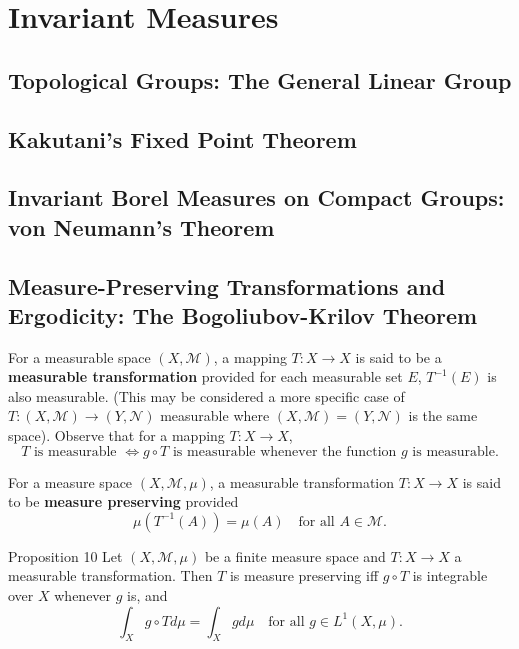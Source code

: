 \chapter{Invariant Measures}

\section{Topological Groups: The General Linear Group}

\section{Kakutani's Fixed Point Theorem}
\section{Invariant Borel Measures on Compact Groups: von Neumann's Theorem}
\section{Measure-Preserving Transformations and Ergodicity: The Bogoliubov-Krilov Theorem}

For a measurable space $(X,\mathcal{M})$, a mapping $T:X\to X$ is said to be a \textbf{measurable transformation} provided for each measurable set $E$, $T^{-1}(E)$ is also measurable.
(This may be considered a more specific case of $T:(X,\mathcal{M})\to(Y,\mathcal{N})$ measurable where $(X,\mathcal{M})=(Y,\mathcal{N})$ is the same space).
Observe that for a mapping $T:X\to X$,
\[
    T\text{ is measurable }\iff g\circ T\text{ is measurable whenever the function $g$ is measurable.}
\]

For a measure space $(X,\mathcal{M},\mu)$, a measurable transformation $T:X\to X$ is said to be \textbf{measure preserving} provided
\[
    \mu(T^{-1}(A))=\mu(A)\quad\text{for all }A\in\mathcal{M}.
\]

\begin{namedthm*}{Proposition 10}
    Let $(X,\mathcal{M},\mu)$ be a finite measure space and $T:X\to X$ a measurable transformation.
    Then $T$ is measure preserving iff $g\circ T$ is integrable over $X$ whenever $g$ is, and 
    \[
        \int_Xg\circ Td\mu=\int_Xgd\mu\quad\text{for all }g\in L^1(X,\mu).
    \]
\end{namedthm*}

